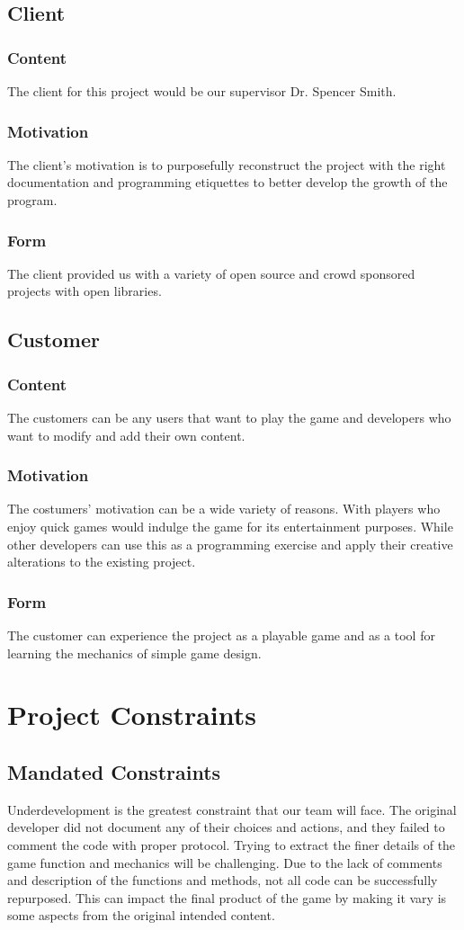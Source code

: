 \documentclass[12pt]{article}
\begin{document}
\subsection{Client}
\subsubsection{Content}
 The client for this project would be our supervisor Dr. Spencer Smith.
\subsubsection{Motivation}
 The client’s motivation is to purposefully reconstruct the project with the right documentation and programming etiquettes to better develop the growth of the program.
\subsubsection{Form}
 The client provided us with a variety of open source and crowd sponsored projects with open libraries.
\subsection{Customer}
\subsubsection{Content}
 The customers can be any users that want to play the game and developers who want to modify and add their own content.
\subsubsection{Motivation}
 The costumers’ motivation can be a wide variety of reasons. With players who enjoy quick games would indulge the game for its entertainment purposes. While other developers can use this as a programming exercise and apply their creative alterations to the existing project.
\subsubsection{Form}
 The customer can experience the project as a playable game and as a tool for learning the mechanics of simple game design.

\section{Project Constraints}
\subsection{Mandated Constraints}
Underdevelopment is the greatest constraint that our team will face. The original developer did not document any of their choices and actions, and they failed to comment the code with proper protocol. Trying to extract the finer details of the game function and mechanics will be challenging. Due to the lack of comments and description of the functions and methods, not all code can be successfully repurposed. This can impact the final product of the game by making it vary is some aspects from the original intended content.
\end{document}
